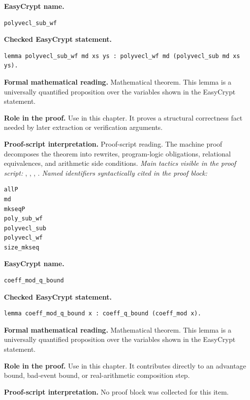 \begin{formaltheorem}
\noindent\textbf{EasyCrypt name.}
\begin{lstlisting}[language=EasyCrypt,basicstyle=\ttfamily\scriptsize]
polyvecl_sub_wf
\end{lstlisting}
\noindent\textbf{Checked EasyCrypt statement.}
\begin{lstlisting}[language=EasyCrypt,basicstyle=\ttfamily\scriptsize]
lemma polyvecl_sub_wf md xs ys : polyvecl_wf md (polyvecl_sub md xs ys).
\end{lstlisting}
\noindent\textbf{Formal mathematical reading.}
Mathematical theorem. This lemma is a universally quantified proposition over the variables shown in the EasyCrypt statement.

\noindent\textbf{Role in the proof.}
Use in this chapter. It proves a structural correctness fact needed by later extraction or verification arguments.

\noindent\textbf{Proof-script interpretation.}
Proof-script reading. The machine proof decomposes the theorem into rewrites, program-logic obligations, relational equivalences, and arithmetic side conditions.
\emph{Main tactics visible in the proof script:} , , , .
\emph{Named identifiers syntactically cited in the proof block:}
\begin{lstlisting}[language=EasyCrypt,basicstyle=\ttfamily\scriptsize]
allP
md
mkseqP
poly_sub_wf
polyvecl_sub
polyvecl_wf
size_mkseq
\end{lstlisting}

\end{formaltheorem}

\begin{formaltheorem}
\noindent\textbf{EasyCrypt name.}
\begin{lstlisting}[language=EasyCrypt,basicstyle=\ttfamily\scriptsize]
coeff_mod_q_bound
\end{lstlisting}
\noindent\textbf{Checked EasyCrypt statement.}
\begin{lstlisting}[language=EasyCrypt,basicstyle=\ttfamily\scriptsize]
lemma coeff_mod_q_bound x : coeff_q_bound (coeff_mod x).
\end{lstlisting}
\noindent\textbf{Formal mathematical reading.}
Mathematical theorem. This lemma is a universally quantified proposition over the variables shown in the EasyCrypt statement.

\noindent\textbf{Role in the proof.}
Use in this chapter. It contributes directly to an advantage bound, bad-event bound, or real-arithmetic composition step.

\noindent\textbf{Proof-script interpretation.}
No proof block was collected for this item.

\end{formaltheorem}

